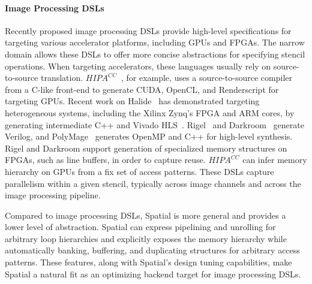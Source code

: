 

\paragraph{Image Processing DSLs}
Recently proposed image processing DSLs provide high-level specifications for targeting various
accelerator platforms, including GPUs and FPGAs.%
The narrow domain allows these DSLs to offer more concise abstractions for specifying stencil operations. 
When targeting accelerators, these languages usually rely on source-to-source translation. 
$HIPA^{CC}$~\cite{membarth2016hipa}, for example, uses a
source-to-source compiler from a C-like front-end to generate CUDA, OpenCL, and Renderscript for
targeting GPUs. 
Recent work on Halide~\cite{pldi13halide} has demonstrated targeting heterogeneous systems, including the Xilinx Zynq's FPGA and ARM cores, by generating intermediate C++ and Vivado HLS~\cite{halidefpga}.
Rigel~\cite{hegarty2016rigel} and Darkroom~\cite{hegarty2014darkroom} generate Verilog, 
and PolyMage~\cite{chugh2016dsl} generates OpenMP and C++ for high-level synthesis. 
Rigel and Darkroom support generation of specialized memory structures on FPGAs, such as line buffers, in order to capture
reuse. $HIPA^{CC}$ can infer memory hierarchy on GPUs from a fix set of access patterns. 
These DSLs capture parallelism within a given stencil, typically across image channels 
and across the image processing pipeline.  

Compared to image processing DSLs, Spatial is more general and provides a 
lower level of abstraction. Spatial can express pipelining and unrolling for arbitrary loop hierarchies and explicitly exposes the memory hierarchy while automatically banking, buffering, and duplicating structures for arbitrary
access patterns. These features, along with Spatial's design tuning
capabilities, make Spatial a natural fit as an optimizing backend target for image processing DSLs.


